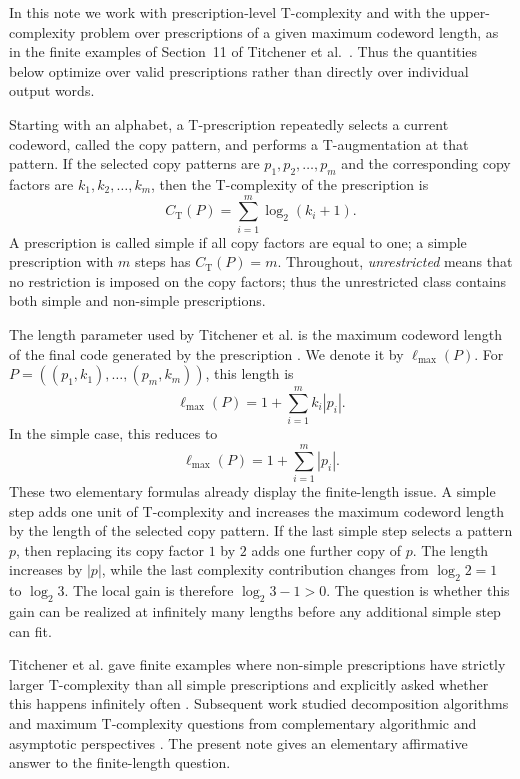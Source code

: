 \documentclass[11pt]{article}
\newcommand{\CT}{C_{\mathrm T}}
\newcommand{\ellmax}{\ell_{\max}}
\begin{document}
In this note we work with prescription-level T-complexity and with the upper-complexity problem over prescriptions of a given maximum codeword length, as in the finite examples of Section~11 of Titchener et al.~\cite{TitchenerEtAl2005}. Thus the quantities below optimize over valid prescriptions rather than directly over individual output words.

Starting with an alphabet, a T-prescription repeatedly selects a current codeword, called the copy pattern, and performs a T-augmentation at that pattern. If the selected copy patterns are $p_1,p_2,\ldots,p_m$ and the corresponding copy factors are $k_1,k_2,\ldots,k_m$, then the T-complexity of the prescription is
\begin{equation}
\CT(P)=\sum_{i=1}^{m}\log_2(k_i+1).
\end{equation}
A prescription is called simple if all copy factors are equal to one; a simple prescription with $m$ steps has $\CT(P)=m$. Throughout, \emph{unrestricted} means that no restriction is imposed on the copy factors; thus the unrestricted class contains both simple and non-simple prescriptions.

The length parameter used by Titchener et al. is the maximum codeword length of the final code generated by the prescription \cite{TitchenerEtAl2005}. We denote it by $\ellmax(P)$. For $P=((p_1,k_1),\ldots,(p_m,k_m))$, this length is
\begin{equation}
\ellmax(P)=1+\sum_{i=1}^{m}k_i|p_i|.
\end{equation}
In the simple case, this reduces to
\begin{equation}
\ellmax(P)=1+\sum_{i=1}^{m}|p_i|.
\end{equation}
These two elementary formulas already display the finite-length issue. A simple step adds one unit of T-complexity and increases the maximum codeword length by the length of the selected copy pattern. If the last simple step selects a pattern $p$, then replacing its copy factor $1$ by $2$ adds one further copy of $p$. The length increases by $|p|$, while the last complexity contribution changes from $\log_2 2=1$ to $\log_2 3$. The local gain is therefore $\log_2 3-1>0$. The question is whether this gain can be realized at infinitely many lengths before any additional simple step can fit.

Titchener et al. gave finite examples where non-simple prescriptions have strictly larger T-complexity than all simple prescriptions and explicitly asked whether this happens infinitely often \cite[Sec.~11]{TitchenerEtAl2005}. Subsequent work studied decomposition algorithms and maximum T-complexity questions from complementary algorithmic and asymptotic perspectives \cite{YangSpeidel2005,Speidel2008,ClarkTeutsch2015}. The present note gives an elementary affirmative answer to the finite-length question.
\end{document}
